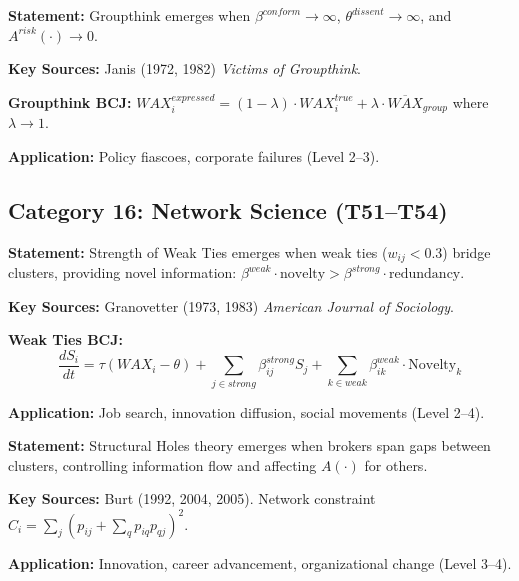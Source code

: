 \begin{tcolorbox}[colback=olive!5!white, colframe=olive!75!black,
    title=Theorem BCJ-T50: Janis Groupthink as Special Case]
\textbf{Statement:} Groupthink emerges when $\beta^{conform} \to \infty$, $\theta^{dissent} \to \infty$, and $A^{risk}(\cdot) \to 0$.

\textbf{Key Sources:} Janis (1972, 1982) \textit{Victims of Groupthink}.

\textbf{Groupthink BCJ:} $WAX_i^{expressed} = (1-\lambda) \cdot WAX_i^{true} + \lambda \cdot \overline{WAX}_{group}$ where $\lambda \to 1$.

\textbf{Application:} Policy fiascoes, corporate failures (Level 2--3).
\end{tcolorbox}

\subsection{Category 16: Network Science (T51--T54)}

\begin{tcolorbox}[colback=violet!5!white, colframe=violet!75!black,
    title=Theorem BCJ-T51: Granovetter Weak Ties as Special Case]
\textbf{Statement:} Strength of Weak Ties emerges when weak ties ($w_{ij} < 0.3$) bridge clusters, providing novel information: $\beta^{weak} \cdot \text{novelty} > \beta^{strong} \cdot \text{redundancy}$.

\textbf{Key Sources:} Granovetter (1973, 1983) \textit{American Journal of Sociology}.

\textbf{Weak Ties BCJ:}
\begin{equation}
\frac{dS_i}{dt} = \tau(WAX_i - \theta) + \sum_{j \in strong} \beta^{strong}_{ij} S_j + \sum_{k \in weak} \beta^{weak}_{ik} \cdot \text{Novelty}_k
\end{equation}

\textbf{Application:} Job search, innovation diffusion, social movements (Level 2--4).
\end{tcolorbox}

\begin{tcolorbox}[colback=violet!5!white, colframe=violet!75!black,
    title=Theorem BCJ-T52: Burt Structural Holes as Special Case]
\textbf{Statement:} Structural Holes theory emerges when brokers span gaps between clusters, controlling information flow and affecting $A(\cdot)$ for others.

\textbf{Key Sources:} Burt (1992, 2004, 2005). Network constraint $C_i = \sum_j (p_{ij} + \sum_q p_{iq} p_{qj})^2$.

\textbf{Application:} Innovation, career advancement, organizational change (Level 3--4).
\end{tcolorbox}

